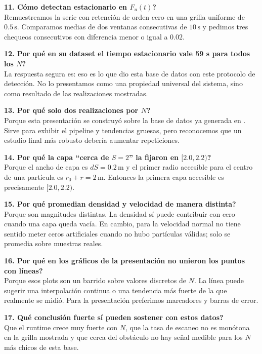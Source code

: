 \documentclass[11pt]{article}
\begin{document}
\textbf{11. \textquestiondown C\'omo detectan estacionario en $F_u(t)$?}\\
Remuestreamos la serie con retenci\'on de orden cero en una grilla uniforme de $0.5\,\mathrm{s}$. Comparamos medias de dos ventanas consecutivas de $10\,\mathrm{s}$ y pedimos tres chequeos consecutivos con diferencia menor o igual a $0.02$.

\textbf{12. \textquestiondown Por qu\'e en su dataset el tiempo estacionario vale 59 s para todos los $N$?}\\
La respuesta segura es: eso es lo que dio esta base de datos con este protocolo de detecci\'on. No lo presentamos como una propiedad universal del sistema, sino como resultado de las realizaciones mostradas.

\textbf{13. \textquestiondown Por qu\'e solo dos realizaciones por $N$?}\\
Porque esta presentaci\'on se construy\'o sobre la base de datos ya generada en . Sirve para exhibir el pipeline y tendencias gruesas, pero reconocemos que un estudio final m\'as robusto deber\'ia aumentar repeticiones.

\textbf{14. \textquestiondown Por qu\'e la capa ``cerca de $S=2$'' la fijaron en $[2.0,2.2)$?}\\
Porque el ancho de capa es $dS=0.2\,\mathrm{m}$ y el primer radio accesible para el centro de una part\'icula es $r_0+r=2\,\mathrm{m}$. Entonces la primera capa accesible es precisamente $[2.0,2.2)$.

\textbf{15. \textquestiondown Por qu\'e promedian densidad y velocidad de manera distinta?}\\
Porque son magnitudes distintas. La densidad s\'i puede contribuir con cero cuando una capa queda vac\'ia. En cambio, para la velocidad normal no tiene sentido meter ceros artificiales cuando no hubo part\'iculas v\'alidas; solo se promedia sobre muestras reales.

\textbf{16. \textquestiondown Por qu\'e en los gr\'aficos de la presentaci\'on no unieron los puntos con l\'ineas?}\\
Porque esos plots son un barrido sobre valores discretos de $N$. La l\'inea puede sugerir una interpolaci\'on continua o una tendencia m\'as fuerte de la que realmente se midi\'o. Para la presentaci\'on preferimos marcadores y barras de error.

\textbf{17. \textquestiondown Qu\'e conclusi\'on fuerte s\'i pueden sostener con estos datos?}\\
Que el runtime crece muy fuerte con $N$, que la tasa de escaneo no es mon\'otona en la grilla mostrada y que cerca del obst\'aculo no hay se\~nal medible para los $N$ m\'as chicos de esta base.
\end{document}
